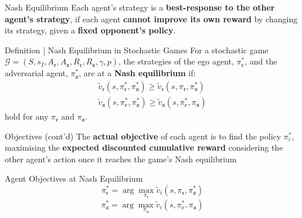\documentclass[10pt, aspectratio=169]{beamer}
\newcommand{\evidenzia}[1]{\textcolor{verdeSalvia}{\textbf{#1}}}
\begin{document}
\begin{frame}{Nash Equilibrium}
    \vspace{0.5cm}
    Each agent's strategy is a \evidenzia{best-response to the other agent's strategy}, if each agent \evidenzia{cannot improve its own reward} by changing its strategy, given a \evidenzia{fixed opponent's policy}.
    \vspace{0.5cm}
    \begin{block}{Definition | Nash Equilibrium in Stochastic Games}
        For a stochastic game $\mathcal{G} = (S, s_I, A_{\mathfrak{e}}, A_{\mathfrak{a}}, R_{\mathfrak{e}}, R_{\mathfrak{a}}, \gamma, p)$, the strategies of the ego agent, $\pi_\mathfrak{e}^*$, and the adversarial agent, $\pi_\mathfrak{a}^*$, are at a \evidenzia{Nash equilibrium} if:
        \begin{align*}
            \tilde{v}_\mathfrak{e}(s, \pi_\mathfrak{e}^*, \pi_\mathfrak{a}^*) \geq \tilde{v}_\mathfrak{e}(s, \pi_\mathfrak{e}, \pi_\mathfrak{a}^*)\\
            \tilde{v}_\mathfrak{a}(s, \pi_\mathfrak{e}^*, \pi_\mathfrak{a}^*) \geq \tilde{v}_\mathfrak{a}(s, \pi_\mathfrak{e}^*, \pi_\mathfrak{a})
        \end{align*}
        hold for any $\pi_\mathfrak{e}$ and $\pi_\mathfrak{a}$.
     \end{block}
    
\end{frame}

\begin{frame}{Objectives (cont'd)}
The \evidenzia{actual objective} of each agent is to find the policy $\pi_i^*$, 
maximising the \evidenzia{expected discounted cumulative reward} considering the other agent's action once it reaches the game's Nash equilibrium
\vspace{0.5cm}

\begin{block}{Agent Objectives at Nash Equilibrium}
\vspace{0.2cm}
$$
\pi_\mathfrak{e}^* = \arg\max_{\pi_\mathfrak{e}} \tilde{v}_i(s, \pi_\mathfrak{e}, \pi_\mathfrak{a}^*)
$$
$$
\pi_\mathfrak{a}^* = \arg\max_{\pi_\mathfrak{a}} \tilde{v}_i(s, \pi_\mathfrak{e}^*, \pi_\mathfrak{a})
$$
\vspace{0.2cm}
\end{block}
\end{frame}
\end{document}

